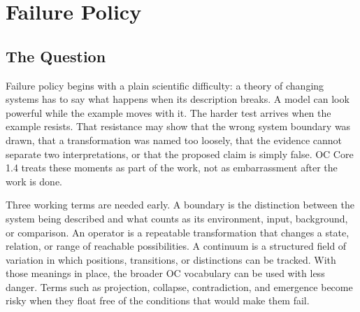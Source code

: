 \documentclass[11pt,a4paper,openany]{book}
\begin{document}
\section{Failure Policy}
\subsection{The Question}
Failure policy begins with a plain scientific difficulty: a theory of changing systems has to say what happens when its description breaks. A model can look powerful while the example moves with it. The harder test arrives when the example resists. That resistance may show that the wrong system boundary was drawn, that a transformation was named too loosely, that the evidence cannot separate two interpretations, or that the proposed claim is simply false. OC Core 1.4 treats these moments as part of the work, not as embarrassment after the work is done. \cite{haken_synergetics,nicolis_prigogine_selforg}\par
Three working terms are needed early. A boundary is the distinction between the system being described and what counts as its environment, input, background, or comparison. An operator is a repeatable transformation that changes a state, relation, or range of reachable possibilities. A continuum is a structured field of variation in which positions, transitions, or distinctions can be tracked. With those meanings in place, the broader OC vocabulary can be used with less danger. Terms such as projection, collapse, contradiction, and emergence become risky when they float free of the conditions that would make them fail.\par
\end{document}
